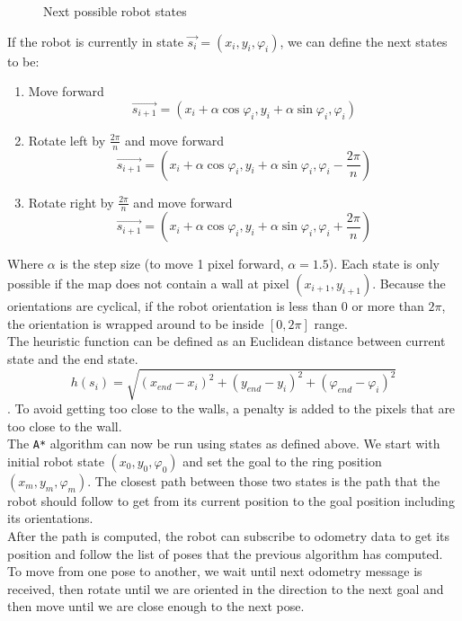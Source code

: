 \documentclass[12pt,a4paper]{article}
\begin{document}
	\begin{figure}[h]
		\centering
		\vspace{6cm}
		\caption{Next possible robot states}
		\label{fig:next_robot_states}
	\end{figure}
	
	If the robot is currently in state $\vec{s_i} = (x_i, y_i, \varphi_i)$, we can define the next states to be:
	
	\begin{enumerate}
		\item Move forward
		$$\vec{s_{i+1}} = (x_i + \alpha \cos \varphi_i, y_i + \alpha \sin \varphi_i, \varphi_i)$$
		\item Rotate left by $\frac{2\pi}{n}$ and move forward
		$$\vec{s_{i+1}} = (x_i + \alpha \cos \varphi_i, y_i + \alpha \sin \varphi_i, \varphi_i - \frac{2\pi}{n})$$
		\item Rotate right by $\frac{2\pi}{n}$ and move forward
		$$\vec{s_{i+1}} = (x_i + \alpha \cos \varphi_i, y_i + \alpha \sin \varphi_i, \varphi_i + \frac{2\pi}{n})$$
	\end{enumerate}
	
	Where $\alpha$ is the step size (to move 1 pixel forward, $\alpha = 1.5$). Each state is only possible if the map does not contain a wall at pixel $(x_{i+1}, y_{i+1})$. Because the orientations are cyclical, if the robot orientation is less than $0$ or more than $2\pi$, the orientation is wrapped around to be inside $[0, 2\pi]$ range. \\
	
	The heuristic function can be defined as an Euclidean distance between current state and the end state. $$h(s_i) = \sqrt{(x_{end} - x_i)^2 + (y_{end} - y_i)^2 + (\varphi_{end} - \varphi_i)^2}$$. To avoid getting too close to the walls, a penalty is added to the pixels that are too close to the wall. \\
	
	The \texttt{A*} algorithm can now be run using states as defined above. We start with initial robot state $(x_0, y_0, \varphi_0)$ and set the goal to the ring position $(x_m, y_m, \varphi_m)$. The closest path between those two states is the path that the robot should follow to get from its current position to the goal position including its orientations. \\
	
	After the path is computed, the robot can subscribe to odometry data to get its position and follow the list of poses that the previous algorithm has computed. To move from one pose to another, we wait until next odometry message is received, then rotate until we are oriented in the direction to the next goal and then move until we are close enough to the next pose. \\
	
\end{document}

